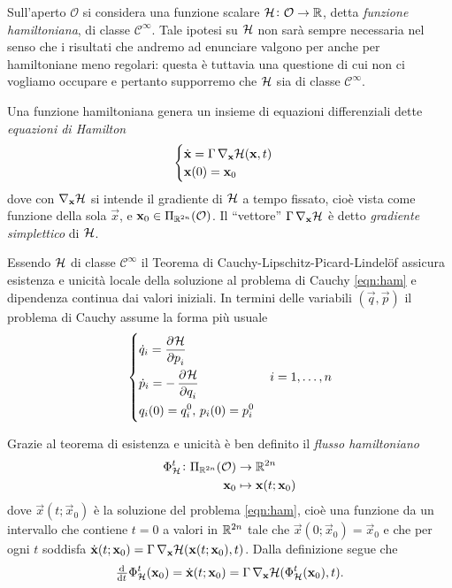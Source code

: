 Sull'aperto $ \mathcal{O} $ si considera una funzione scalare $ \mathcal{H} \colon \mathcal{O} \to \mathbb{R} $, detta \emph{funzione hamiltoniana}, di classe $ \mathcal{C}^{\infty} $. Tale ipotesi su $ \mathcal{H} $ non sarà sempre necessaria nel senso che i risultati che andremo ad enunciare valgono per anche per hamiltoniane meno regolari: questa è tuttavia una questione di cui non ci vogliamo occupare e pertanto supporremo che $ \mathcal{H} $ sia di classe $ \mathcal{C}^\infty $.

Una funzione hamiltoniana genera un insieme di equazioni differenziali dette \emph{equazioni di Hamilton}
\begin{equation} \label{eqn:ham}
    \begin{cases}
    \dot{\mathbf{x}} = \Gamma \, \nabla_{\mathbf{x}} \mathcal{H}(\mathbf{x}, t) \\
    \mathbf{x}(0) = \mathbf{x}_0
    \end{cases}
\end{equation}
dove con $ \nabla_{\mathbf{x}} \mathcal{H} $ si intende il gradiente di $ \mathcal{H} $ a tempo fissato, cioè vista come funzione della sola $ \vec{x} $, e $ \mathbf{x}_0 \in \Pi_{\mathbb{R}^{2n}}(\mathcal{O}) $. Il ``vettore'' $ \Gamma \, \nabla_{\mathbf{x}} \mathcal{H} $ è detto \emph{gradiente simplettico} di $ \mathcal{H} $.

Essendo $ \mathcal{H} $ di classe $ \mathcal{C}^\infty $ il Teorema di Cauchy-Lipschitz-Picard-Lindelöf assicura esistenza e unicità locale della soluzione al problema di Cauchy \eqref{eqn:ham} e dipendenza continua dai valori iniziali. In termini delle variabili $ (\vec{q}, \vec{p}) $ il problema di Cauchy assume la forma più usuale
\begin{equation}
    \begin{dcases}
        \dot{q}_i = \dpd{\ham}{p_i} \\
        \dot{p}_i = -\dpd{\ham}{q_i} \\
        q_i(0) = q_{i}^0, \, p_i(0) = p_i^0 \\
    \end{dcases}
    \quad i = 1, \ldots, n
\end{equation}

Grazie al teorema di esistenza e unicità è ben definito il \emph{flusso hamiltoniano}
\begin{align}
    \Phi_{\mathcal{H}}^t \colon \Pi_{\mathbb{R}^{2n}}(\mathcal{O}) & \to \mathbb{R}^{2n} \\
    \mathbf{x}_0 & \mapsto \mathbf{x}(t; \mathbf{x}_0) \nonumber
\end{align}
dove $ \vec{x}(t; \vec{x}_0) $ è la soluzione del problema \eqref{eqn:ham}, cioè una funzione da un intervallo che contiene $ t=0 $ a valori in $ \mathbb{R}^{2n} $ tale che $ \vec{x}(0; \vec{x}_0) = \vec{x}_0 $ e che per ogni $ t $ soddisfa $ \dot{\mathbf{x}}(t; \mathbf{x}_0) = \Gamma \, \nabla_{\mathbf{x}} \mathcal{H}(\mathbf{x}(t; \mathbf{x}_0), t) $. Dalla definizione segue che
\[
    \od{}{t}\Phi^t_\ham(\vec{x}_0) = \dot{\vec{x}}(t; \vec{x}_0) = \Gamma \, \nabla_\vec{x} \ham(\Phi_\ham^t(\vec{x}_0), t).
\]

